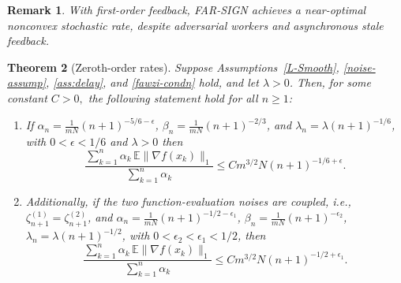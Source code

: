 \documentclass{article}
\newtheorem{theorem}{Theorem}[section]
\newtheorem{remark}[theorem]{Remark}
\newcommand{\rsign}{R-SIGN\xspace}
\newcommand{\farsign}{FAR-SIGN\xspace}
\begin{document}
%
\begin{remark}
    With first-order feedback, \farsign achieves a near-optimal nonconvex stochastic rate, despite adversarial workers and asynchronous stale feedback.
\end{remark}

\begin{theorem}[Zeroth-order rates]
\label{thm:rate_optimal}
Suppose Assumptions~\ref{L-Smooth}, \ref{noise-assump}, \ref{ass:delay},
and \ref{fawzi-condn} hold, and let $\lambda>0$. Then, for some constant $C>0,$ the following statement hold for all $n\ge1$:
\begin{enumerate}[leftmargin=*]
    \item If
    $\alpha_n = \frac{1}{mN}(n+1)^{-5/6-\epsilon}$,
    $\beta_n =\frac{1}{mN} (n+1)^{-2/3}$, and
    $\lambda_n=\lambda(n+1)^{-1/6}$, with $0<\epsilon<1/6$ and $\lambda >0$ then
    \[
        \frac{\sum_{k=1}^n \alpha_k\,\mathbb E\|\nabla f(x_k)\|_1}
        {\sum_{k=1}^n \alpha_k}
        \le
        C m^{3/2}N (n+1)^{-1/6+\epsilon}.
    \]

    \item Additionally, if the two function-evaluation noises are coupled, i.e.,
    $\zeta_{n+1}^{(1)}=\zeta_{n+1}^{(2)}$, and
    $\alpha_n = \frac{1}{mN}(n+1)^{-1/2-\epsilon_1}$,
    $\beta_n = \frac{1}{mN} (n+1)^{-\epsilon_2}$,
    $\lambda_n=\lambda(n+1)^{-1/2}$, with
    $0<\epsilon_2<\epsilon_1<1/2$, then
    \[
        \frac{\sum_{k=1}^n \alpha_k\,\mathbb E\|\nabla f(x_k)\|_1}
        {\sum_{k=1}^n \alpha_k}
        \le
        C m^{3/2}N (n+1)^{-1/2+\epsilon_1}.
    \]
\end{enumerate}
\end{theorem}
\end{document}
